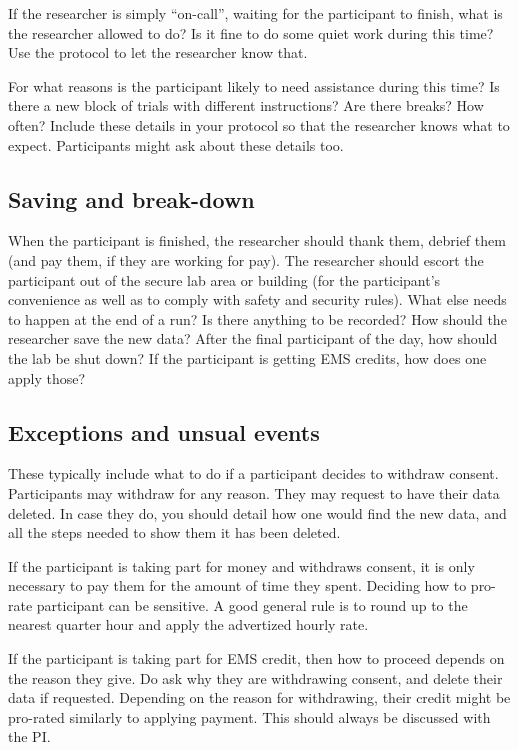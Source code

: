 \documentclass[12pt,]{book}
\theoremstyle{definition}
\theoremstyle{definition}
\theoremstyle{definition}
\theoremstyle{remark}
\begin{document}
If the researcher is simply ``on-call'', waiting for the participant to
finish, what is the researcher allowed to do? Is it fine to do some
quiet work during this time? Use the protocol to let the researcher know
that.

For what reasons is the participant likely to need assistance during
this time? Is there a new block of trials with different instructions?
Are there breaks? How often? Include these details in your protocol so
that the researcher knows what to expect. Participants might ask about
these details too.

\subsection{Saving and break-down}\label{saving-and-break-down}

When the participant is finished, the researcher should thank them,
debrief them (and pay them, if they are working for pay). The researcher
should escort the participant out of the secure lab area or building
(for the participant's convenience as well as to comply with safety and
security rules). What else needs to happen at the end of a run? Is there
anything to be recorded? How should the researcher save the new data?
After the final participant of the day, how should the lab be shut down?
If the participant is getting EMS credits, how does one apply those?

\subsection{Exceptions and unsual
events}\label{exceptions-and-unsual-events}

These typically include what to do if a participant decides to withdraw
consent. Participants may withdraw for any reason. They may request to
have their data deleted. In case they do, you should detail how one
would find the new data, and all the steps needed to show them it has
been deleted.

If the participant is taking part for money and withdraws consent, it is
only necessary to pay them for the amount of time they spent. Deciding
how to pro-rate participant can be sensitive. A good general rule is to
round up to the nearest quarter hour and apply the advertized hourly
rate.

If the participant is taking part for EMS credit, then how to proceed
depends on the reason they give. Do ask why they are withdrawing
consent, and delete their data if requested. Depending on the reason for
withdrawing, their credit might be pro-rated similarly to applying
payment. This should always be discussed with the PI.
\end{document}
